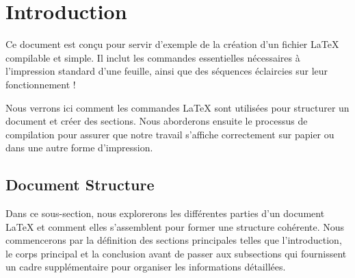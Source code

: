 \documentclass{article}
\begin{document}


\section{Introduction}
Ce document est conçu pour servir d'exemple de la création d'un fichier LaTeX compilable et simple. Il inclut les commandes essentielles nécessaires à l’impression standard d'une feuille, ainsi que des séquences éclaircies sur leur fonctionnement !

Nous verrons ici comment les commandes LaTeX sont utilisées pour structurer un document et créer des sections. Nous aborderons ensuite le processus de compilation pour assurer que notre travail s'affiche correctement sur papier ou dans une autre forme d'impression.

\subsection{Document Structure} 

Dans ce sous-section, nous explorerons les différentes parties d’un document LaTeX et comment elles s'assemblent pour former une structure cohérente. Nous commencerons par la définition des sections principales telles que l'introduction, le corps principal et la conclusion avant de passer aux subsections qui fournissent un cadre supplémentaire pour organiser les informations détaillées.
\end{document}

